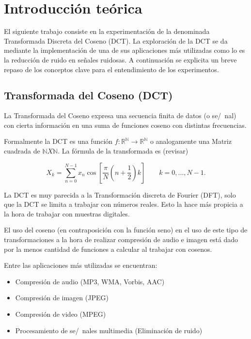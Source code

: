 \section{Introducci\'on te\'orica}

El siguiente trabajo consiste en la experimentaci\'on de la denominada 
Transformada Discreta del Coseno (DCT). La exploraci\'on de la DCT se da
mediante la implementaci\'on de una de sus aplicaciones m\'as utilizadas como lo
es la reducci\'on de ruido en se\~nales ruidosas. A continuaci\'on se explicita
un breve repaso de los conceptos clave para el entendimiento de los
experimentos.

\subsection{Transformada del Coseno (DCT)}

La Transformada del Coseno expresa una secuencia finita de datos (o se/~nal) 
con cierta informaci\'on en una suma de funciones coseno con distintas 
frecuencias.

Formalmente la DCT es una funci\'on $f:\mathbb{R}^\mathbb{N} \to \mathbb{R}^
\mathbb{N}$ o analogamente una
Matriz cuadrada de $\mathbb{N} X \mathbb{N}$. La f\'ormula de la transformada es
(revisar)

$$X_k = \sum_{n=0}^{N-1} x_n \cos \left[\frac{\pi}{N} \left(n+\frac{1}{2}\right) 
k \right] \quad \quad k = 0, \dots, N-1.$$ 

La DCT es muy parecida a la Transformaci\'on discreta de Fourier (DFT), solo que
la DCT se limita a trabajar con n\'umeros reales. Esto la hace m\'as propicia a
la hora de trabajar con muestras digitales.

El uso del coseno (en contraposici\'on con la funci\'on seno) en el uso de este
tipo de transformaciones a la hora de realizar compresi\'on de audio e imagen
est\'a dado por la menos cantidad de funciones a calcular al trabajar con
cosenos.

Entre las aplicaciones m\'as utilizadas se encuentran:

\begin{itemize}
\item Compresi\'on de audio (MP3, WMA, Vorbis, AAC)
\item Compresi\'on de imagen (JPEG)
\item Compresi\'on de video (MPEG)
\item Procesamiento de se/~nales multimedia (Eliminaci\'on de ruido)
\end{itemize}

